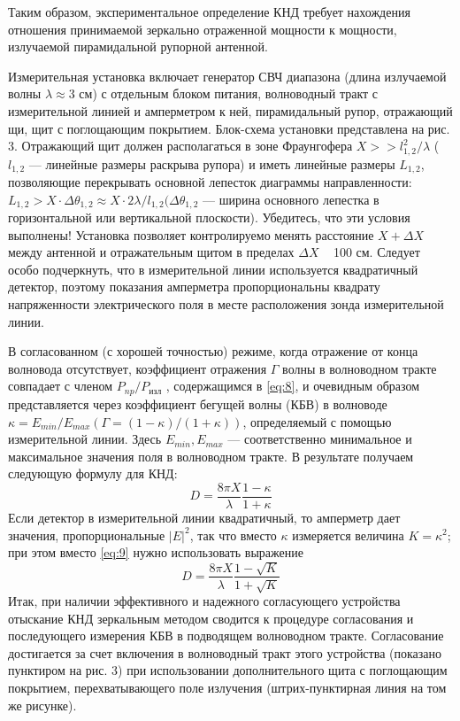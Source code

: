 Таким образом, экспериментальное определение КНД требует нахождения отношения принимаемой зеркально отраженной мощности 
к мощности, излучаемой пирамидальной рупорной антенной. 

Измерительная установка включает генератор СВЧ диапазона (длина излучаемой волны $\lambda \approx$3 см) с отдельным 
блоком питания, волноводный тракт с измерительной линией и амперметром к ней, пирамидальный рупор, отражающий щи, 
щит с поглощающим покрытием. Блок-схема установки представлена на рис. 3. Отражающий щит должен располагаться в зоне 
Фраунгофера $X>>l_{1,2}^2/\lambda$ ($l_{1,2}$ — линейные размеры раскрыва рупора) и иметь линейные 
размеры $L_{1,2}$, позволяющие перекрывать основной лепесток диаграммы направленности:
 $ L_{1,2}>X \cdot \Delta \theta_{1,2} \approx X \cdot 2 \lambda / l_{1,2} (\Delta \theta_{1,2}$
— ширина основного лепестка в горизонтальной или вертикальной плоскости). Убедитесь, что эти условия выполнены! 
Установка позволяет контролируемо менять расстояние $X + \Delta X$ между антенной и отражательным щитом в пределах $\Delta X$ ~ 100 см. 
Следует особо подчеркнуть, что в измерительной линии используется квадратичный детектор, поэтому показания амперметра 
пропорциональны квадрату напряженности электрического поля в месте расположения зонда измерительной линии.

В согласованном (с хорошей точностью) режиме, когда отражение от конца волновода отсутствует, коэффициент отражения $\Gamma$ 
волны в волноводном тракте совпадает с членом $P_{np}/P_{\text{изл}}$ , содержащимся в \ref{eq:8}, и очевидным образом 
представляется через коэффициент бегущей волны (КБВ) в волноводе $\kappa = E_{min}/E_{max} (\Gamma= (1-\kappa)/(1+\kappa) )$, 
определяемый с помощью измерительной линии. Здесь $E_{min}, E_{max}$ — соответственно минимальное и максимальное значения 
поля в волноводном тракте. В результате получаем следующую формулу для КНД:
\begin{equation}
    D=\frac{8 \pi X}{\lambda} \frac{1-\kappa}{1+\kappa}
    \label{eq:9}
\end{equation}
Если детектор в измерительной линии квадратичный, то амперметр дает значения, пропорциональные $|E|^2$, так что вместо 
$\kappa$ измеряется величина $K = \kappa^2$; при этом вместо \ref{eq:9} нужно использовать выражение
\begin{equation}
    D=\frac{8 \pi X}{\lambda} \frac{1-\sqrt{K}}{1+\sqrt{K}}
    \label{eq:10}
\end{equation}
Итак, при наличии эффективного и надежного согласующего устройства отыскание КНД зеркальным методом сводится к 
процедуре согласования и последующего измерения КБВ в подводящем волноводном тракте. Согласование достигается за 
счет включения в волноводный тракт этого устройства (показано пунктиром на рис. 3) при использовании дополнительного 
щита с поглощающим покрытием, перехватывающего поле излучения (штрих-пунктирная линия на том же рисунке).

